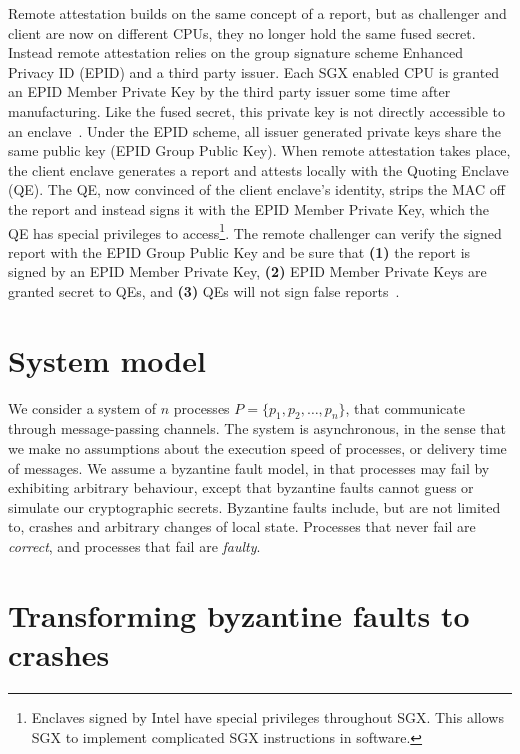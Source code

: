 \documentclass{article}
\begin{document}
			Remote attestation builds on the same concept of a report, but as challenger and client are now on different CPUs, they no longer hold the same fused secret.
			Instead remote attestation relies on the group signature scheme Enhanced Privacy ID (EPID) and a third party issuer.
			Each SGX enabled CPU is granted an EPID Member Private Key by the third party issuer some time after manufacturing.
			Like the fused secret, this private key is not directly accessible to an enclave~\cite{costan_intel_2016}.
			Under the EPID scheme, all issuer generated private keys share the same public key (EPID Group Public Key).
			When remote attestation takes place, the client enclave generates a report and attests locally with the Quoting Enclave (QE).
			The QE, now convinced of the client enclave's identity, strips the MAC off the report and instead signs it with the EPID Member Private Key, which the QE has special privileges to access\footnote{Enclaves signed by Intel have special privileges throughout SGX. This allows SGX to implement complicated SGX instructions in software.}.
			The remote challenger can verify the signed report with the EPID Group Public Key and be sure that \textbf{(1)} the report is signed by an EPID Member Private Key, \textbf{(2)} EPID Member Private Keys are granted secret to QEs, and \textbf{(3)} QEs will not sign false reports~\cite{costan_intel_2016}.

	\section{System model}

	We consider a system of $n$ processes $P=\{p_1, p_2, \dots, p_n\}$, that communicate through message-passing channels.
	The system is asynchronous, in the sense that we make no assumptions about the execution speed of processes, or delivery time of messages.
	We assume a byzantine fault model, in that processes may fail by exhibiting arbitrary behaviour, except	that byzantine faults cannot guess or simulate our cryptographic secrets.
	Byzantine faults include, but are not limited to, crashes and arbitrary changes of local state.
	Processes that never fail are \textit{correct}, and processes that fail are \textit{faulty}.

	\section{Transforming byzantine faults to crashes}
	\label{sec:transforming-byzantine-faults}
\end{document}
